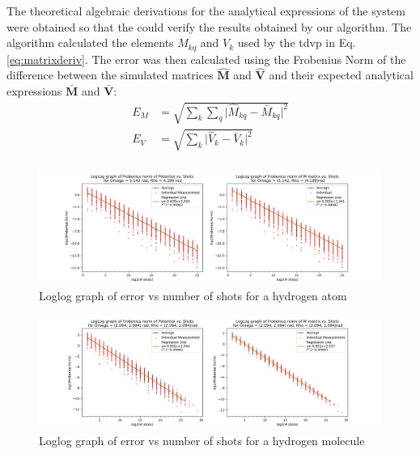 \documentclass{aux/ttuthes2007}
\begin{document}
The theoretical algebraic derivations for the analytical expressions of the system were obtained so that the could verify the results obtained by our algorithm.
The algorithm calculated the elements $M_{kq}$ and $V_k$ used by the \gls{tdvp} in Eq. \ref{eq:matrixderiv}. The error was then calculated using the Frobenius Norm of the difference between the simulated matrices $\hat {\bm M}$ and $\hat {\bm V}$ and their expected analytical expressions $\bm {\bar M}$ and $\bm {\bar V}$:
%
\begin{equation*}
	\begin{split}
		E_M &= \sqrt{\sum_k \sum_q \lvert {\hat M_{kq} - \bar M_{kq}} \rvert ^ 2 }\\
		E_V &= \sqrt{\sum_k \lvert {\hat V_{k} - \bar V_{k}} \rvert ^ 2 }\\
	\end{split}
\end{equation*}
%
\begin{figure}[h!]
	\includegraphics[width=\linewidth]{img/1e.jpg}
  \caption{Loglog graph of error vs number of shots for a hydrogen atom}
  \label{fig:1derrorgraph}
\end{figure}

\begin{figure}[h!]
	\includegraphics[width=\linewidth]{img/2e-nonint.jpg}
  \caption{Loglog graph of error vs number of shots for a hydrogen molecule}
  \label{fig:2derrorgraph}
\end{figure}
\end{document}
